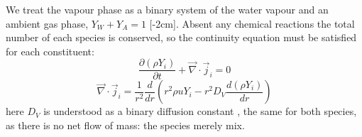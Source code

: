 \documentclass[11pt,twoside]{report}
\begin{document}
We treat the vapour phase as a binary system of the water vapour and an ambient gas phase, $Y_W + Y_A = 1$%
[-2cm].
Absent any chemical reactions the total number of each species is conserved, so the continuity equation must be satisfied for each constituent:
\begin{equation}
  \frac{\partial (\rho Y_i)}{\partial t}
  + \vec{\nabla} \cdot \vec{j}_i = 0
\end{equation}
\begin{equation}
  \vec{\nabla} \cdot \vec{j}_i =
  \frac{1}{r^2} \frac{d}{dr} \left(
  r^2 \rho u Y_i - r^2 D_V \frac{d(\rho Y_i)}{dr}
  \right)
\end{equation}
here $D_V$ is understood as a binary diffusion constant%
,
the same for both species, as there is no net flow of mass: the species merely mix.
\end{document}
